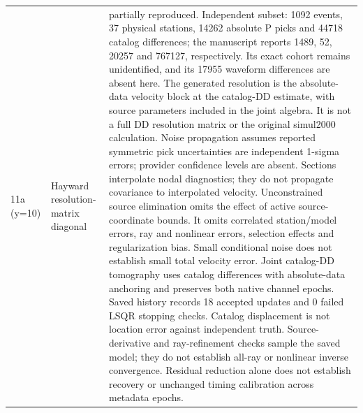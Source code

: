 \begin{longtable}{>{\raggedright\arraybackslash}p{}>{\raggedright\arraybackslash}p{}>{\raggedright\arraybackslash}p{}}
11a (y=10) & Hayward resolution-matrix diagonal & partially reproduced. Independent subset: 1092 events, 37 physical stations, 14262 absolute P picks and 44718 catalog differences; the manuscript reports 1489, 52, 20257 and 767127, respectively. Its exact cohort remains unidentified, and its 17955 waveform differences are absent here. The generated resolution is the absolute-data velocity block at the catalog-DD estimate, with source parameters included in the joint algebra. It is not a full DD resolution matrix or the original simul2000 calculation. Noise propagation assumes reported symmetric pick uncertainties are independent 1-sigma errors; provider confidence levels are absent. Sections interpolate nodal diagnostics; they do not propagate covariance to interpolated velocity. Unconstrained source elimination omits the effect of active source-coordinate bounds. It omits correlated station/model errors, ray and nonlinear errors, selection effects and regularization bias. Small conditional noise does not establish small total velocity error. Joint catalog-DD tomography uses catalog differences with absolute-data anchoring and preserves both native channel epochs. Saved history records 18 accepted updates and 0 failed LSQR stopping checks. Catalog displacement is not location error against independent truth. Source-derivative and ray-refinement checks sample the saved model; they do not establish all-ray or nonlinear inverse convergence. Residual reduction alone does not establish recovery or unchanged timing calibration across metadata epochs.\\

\end{longtable}
